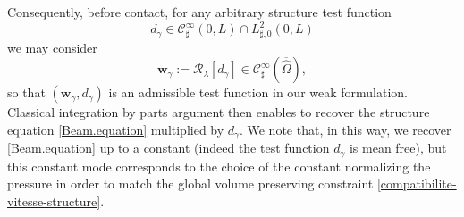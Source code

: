 \documentclass[11pt]{article}
\let\mathcal\mathscr
\theoremstyle{remark}
\theoremstyle{definition}
\newcommand{\wg}{\boldsymbol{w}}
\begin{document}
Consequently, before contact, for any arbitrary structure test function
\[
d_{\gamma} \in \mathcal{C}^{\infty}_{\sharp}(0,L) \cap L^2_{\sharp,0}(0,L)
\]
we may consider
\[
\wg_{\gamma} := \mathcal R_{{\lambda}}[d_{\gamma}] \in \mathcal{C}^{\infty}_{\sharp}(\overline{\hat{\Omega}}),
\]
so that $(\wg_{\gamma},d_{\gamma})$ is an admissible test function in our weak formulation. Classical integration by parts argument then enables to recover the structure equation \eqref{Beam.equation} multiplied by $d_{\gamma}$. We note that, in this way, we recover \eqref{Beam.equation} up to a constant (indeed the test function $d_{\gamma}$ is mean free), but this constant mode corresponds to the choice of the constant normalizing the pressure in order to match the global volume preserving constraint
\eqref{compatibilite-vitesse-structure}.
\end{document}
